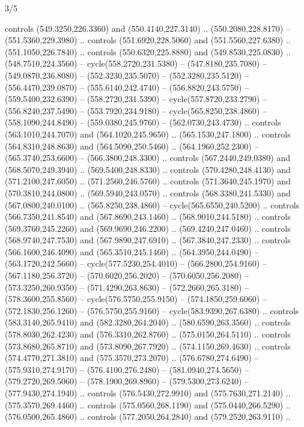 \begin{flagdescription}{3/5}
\begin{scope}[xshift=0.5\flaglength,yshift=0.5\flagwidth,scale=\flagwidth/768]
\begin{scope}[y=0.80pt, x=0.80pt, yscale=-1.75, xscale=1.75,xshift=-74mm,yshift=-108mm]
\begin{scope}[shift={(-236.93803,83.83961)},fill=cc8a400]
  controls (549.3250,226.3360) and (550.4140,227.3140) .. (550.2080,228.8170) --
  (551.5360,229.3980) .. controls (551.6920,228.5060) and (551.5560,227.6380) ..
  (551.1050,226.7840) .. controls (550.6320,225.8880) and (549.8530,225.0830) ..
  (548.7510,224.3560) -- cycle(558.2720,231.5380) -- (547.8180,235.7080) --
  (549.0870,236.8080) -- (552.3230,235.5070) -- (552.3280,235.5120) --
  (556.4470,239.0870) -- (555.6140,242.4740) -- (556.8820,243.5750) --
  (559.5400,232.6390) -- (558.2720,231.5390) -- cycle(557.8720,233.2790) --
  (556.8240,237.5490) -- (553.7920,234.9180) -- cycle(565.8250,238.4860) --
  (558.1090,244.8490) -- (559.0380,245.9760) -- (562.0730,243.4730) .. controls
  (563.1010,244.7070) and (564.1020,245.9650) .. (565.1530,247.1800) .. controls
  (564.8310,248.8630) and (564.5090,250.5460) .. (564.1960,252.2300) --
  (565.3740,253.6600) -- (566.3800,248.3300) .. controls (567.2440,249.0380) and
  (568.5070,249.3940) .. (569.5400,248.8330) .. controls (570.4280,248.4130) and
  (571.2100,247.6050) .. (571.2560,246.5760) .. controls (571.3640,245.1970) and
  (570.3810,244.0800) .. (569.5940,243.0570) .. controls (568.3380,241.5330) and
  (567.0800,240.0100) .. (565.8250,238.4860) -- cycle(565.6550,240.5200) ..
  controls (566.7350,241.8540) and (567.8690,243.1460) .. (568.9010,244.5180) ..
  controls (569.3760,245.2260) and (569.9690,246.2200) .. (569.4240,247.0460) ..
  controls (568.9740,247.7530) and (567.9890,247.6910) .. (567.3840,247.2330) ..
  controls (566.1600,246.4090) and (565.3510,245.1460) .. (564.3950,244.0490) --
  (563.1720,242.5660) -- cycle(577.5230,254.4010) -- (566.2800,254.9160) --
  (567.1180,256.3720) -- (570.6020,256.2020) -- (570.6050,256.2080) --
  (573.3250,260.9350) -- (571.4290,263.8630) -- (572.2660,265.3180) --
  (578.3600,255.8560) -- cycle(576.5750,255.9150) -- (574.1850,259.6060) --
  (572.1830,256.1260) -- (576.5750,255.9160) -- cycle(583.9390,267.6380) ..
  controls (583.3140,265.9410) and (582.3280,264.2040) .. (580.6590,263.3560) ..
  controls (578.8030,262.4230) and (576.3310,262.8760) .. (575.0150,264.5110) ..
  controls (573.8680,265.8710) and (573.8090,267.7920) .. (574.1150,269.4630) ..
  controls (574.4770,271.3810) and (575.3570,273.2070) .. (576.6780,274.6490) --
  (575.9310,274.9170) -- (576.4100,276.2480) -- (581.0940,274.5650) --
  (579.2720,269.5060) -- (578.1900,269.8960) -- (579.5300,273.6240) --
  (577.9430,274.1940) .. controls (576.5430,272.9910) and (575.7630,271.2140) ..
  (575.3570,269.4460) .. controls (575.0560,268.1190) and (575.0440,266.5290) ..
  (576.0500,265.4860) .. controls (577.2050,264.2840) and (579.2520,263.9110) ..

\end{scope}
\end{scope}
\end{scope}
\end{flagdescription}
